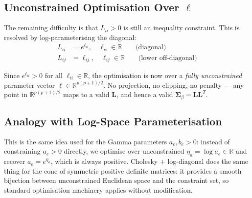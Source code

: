 \documentclass[11pt,a4paper]{article}
\newcommand{\R}{\mathbb{R}}
\begin{document}
\subsection*{Unconstrained Optimisation Over $\bm{\ell}$}

The remaining difficulty is that $L_{ii} > 0$ is still an inequality constraint. This is resolved by log-parameterising the diagonal:
\begin{align}
  L_{ii} &= e^{\ell_{ii}}, \quad \ell_{ii} \in \R \qquad \text{(diagonal)}\\
  L_{ij} &= \ell_{ij}, \quad \ell_{ij} \in \R \qquad \text{(lower off-diagonal)}
\end{align}

Since $e^{\ell_{ii}} > 0$ for all $\ell_{ii} \in \R$, the optimisation is now over a \emph{fully unconstrained} parameter vector $\bm{\ell} \in \R^{p(p+1)/2}$. No projection, no clipping, no penalty --- any point in $\R^{p(p+1)/2}$ maps to a valid $\bm{L}$, and hence a valid $\bm{\Sigma}_\beta = \bm{L}\bm{L}^T$.

\subsection*{Analogy with Log-Space Parameterisation}

This is the same idea used for the Gamma parameters $a_e, b_e > 0$: instead of constraining $a_e > 0$ directly, we optimise over unconstrained $\eta_a = \log a_e \in \R$ and recover $a_e = e^{\eta_a}$, which is always positive. Cholesky + log-diagonal does the same thing for the cone of symmetric positive definite matrices: it provides a smooth bijection between unconstrained Euclidean space and the constraint set, so standard optimisation machinery applies without modification.
\end{document}
